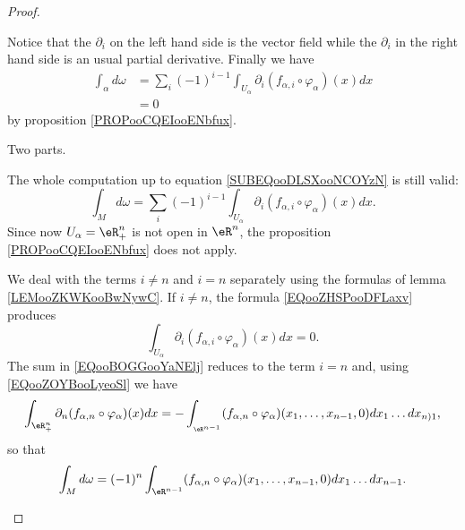 \begin{proof}
\begin{subproof}
\begin{subproof}
\begin{equation}
			\end{equation}
			Notice that the \( \partial_i\) on the left hand side is the vector field while the \( \partial_i\) in the right hand side is an usual partial derivative. Finally we have
			\begin{subequations}
				\begin{align}
					\int_{\alpha}d\omega & =\sum_i(-1)^{i-1}\int_{U_{\alpha}}\partial_i(f_{\alpha,i}\circ\varphi_{\alpha})(x)dx		\label{SUBEQooDLSXooNCOYzN} \\
					                     & =0
				\end{align}
			\end{subequations}
			by proposition \ref{PROPooCQEIooENbfux}.
		\end{subproof}
		\spitem[Support in \( \varphi_{\alpha}(U_{\alpha})\) with \( U_{\alpha}=\eR^n_+\)]		\label{SPITEMooHDCRooMfAROG}
		Two parts.
		\begin{subproof}
			\spitem[On \( M\)]
			The whole computation up to equation \eqref{SUBEQooDLSXooNCOYzN} is still valid:
			\begin{equation}		\label{EQooBOGGooYaNElj}
				\int_Md\omega=\sum_i(-1)^{i-1}\int_{U_{\alpha}}\partial_i(f_{\alpha,i}\circ\varphi_{\alpha})(x)dx.
			\end{equation}
			Since now \( U_{\alpha}=\eR^n_+\) is not open in \( \eR^n\), the proposition \eqref{PROPooCQEIooENbfux} does not apply.

			We deal with the terms \( i\neq n\) and \( i=n\) separately using the formulas of lemma \ref{LEMooZKWKooBwNywC}. If \( i\neq n\), the formula \eqref{EQooZHSPooDFLaxv} produces
			\begin{equation}
				\int_{U_{\alpha}}\partial_i(f_{\alpha,i}\circ\varphi_{\alpha})(x)dx=0.
			\end{equation}
			The sum in \eqref{EQooBOGGooYaNElj} reduces to the term \( i=n\) and, using \eqref{EQooZOYBooLyeoSl} we have
			\begin{equation}
				\int_{\eR^n_+}\partial_n(f_{\alpha,n}\circ\varphi_{\alpha})(x)dx=-\int_{_{\eR^{n-1}}}(f_{\alpha,n}\circ\varphi_{\alpha})(x_1,\ldots,x_{n-1},0)dx_1\ldots dx_{n)1},
			\end{equation}
			so that
			\begin{equation}		\label{EQooKAPUooQewdnN}
				\int_Md\omega=(-1)^{n}\int_{\eR^{n-1}}(f_{\alpha,n}\circ \varphi_{\alpha})(x_1,\ldots,x_{n-1},0)dx_1\ldots dx_{n-1}.
			\end{equation}


\end{subproof}
\end{subproof}
\end{proof}
